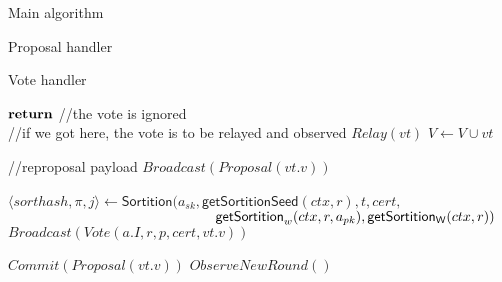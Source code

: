 \documentclass[10pt,a4paper]{article}
\begin{document}
\begin{section}{Main algorithm}
\begin{subsection}{Proposal handler}
\end{subsection}


\begin{subsection}{Vote handler}\label{ssect:HandleVote}

    \begin{algorithm}[H]
        \begin{algorithmic}[1]

                \State $\Return$ //the vote is ignored
            \EndIf \\

            //if we got here, the vote is to be relayed and observed
            \State $Relay(vt)$
            \State $V \gets V \cup vt$

                //reproposal payload
                \State $Broadcast(Proposal(vt.v))$

                    \State $\langle sorthash, \pi, j\rangle\gets 
                    \mathsf{Sortition}(
                    a_{sk}, 
                    \mathsf{getSortitionSeed}(ctx, r), 
                    t, 
                    cert, $ \newline
                    ${}$ ${\hskip 5.2cm}\mathsf{getSortition}_w(ctx, r, a_{pk}), 
                    \mathsf{getSortition_W}(ctx, r)
                    )$
                        \State $Broadcast(Vote(a.I,r,p,cert,vt.v))$
                    \EndIf
                \EndFor
            
                \State $Commit(Proposal(vt.v))$
                \State $ObserveNewRound()$


\end{algorithmic}
\end{algorithm}
\end{subsection}
\end{section}
\end{document}
